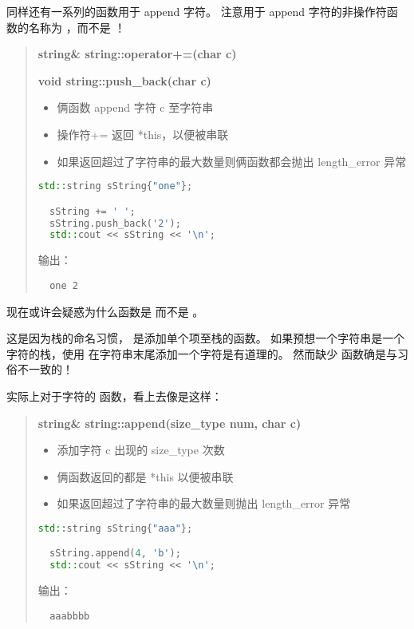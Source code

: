 \documentclass[../../LearnCpp.tex]{subfiles}
\begin{document}
同样还有一系列的函数用于 append 字符。
注意用于 append 字符的非操作符函数的名称为 ，而不是 ！

\begin{quotation}
  \textbf{string\& string::operator+=(char c)}

  \textbf{void string::push\_back(char c)}

  \begin{itemize}
    \item 俩函数 append 字符 c 至字符串
    \item 操作符+= 返回 *this，以便被串联
    \item 如果返回超过了字符串的最大数量则俩函数都会抛出 length\_error 异常
  \end{itemize}

  \begin{lstlisting}[language=C++]
  std::string sString{"one"};

  sString += ' ';
  sString.push_back('2');
  std::cout << sString << '\n';
  \end{lstlisting}

  输出：

  \begin{lstlisting}
  one 2
  \end{lstlisting}
\end{quotation}

现在或许会疑惑为什么函数是  而不是 。

这是因为栈的命名习惯， 是添加单个项至栈的函数。
如果预想一个字符串是一个字符的栈，使用  在字符串末尾添加一个字符是有道理的。
然而缺少  函数确是与习俗不一致的！

实际上对于字符的  函数，看上去像是这样：

\begin{quotation}
  \textbf{string\& string::append(size\_type num, char c)}

  \begin{itemize}
    \item 添加字符 c 出现的 size\_type 次数
    \item 俩函数返回的都是 *this 以便被串联
    \item 如果返回超过了字符串的最大数量则抛出 length\_error 异常
  \end{itemize}

  \begin{lstlisting}[language=C++]
  std::string sString{"aaa"};

  sString.append(4, 'b');
  std::cout << sString << '\n';
  \end{lstlisting}

  输出：

  \begin{lstlisting}
  aaabbbb
  \end{lstlisting}
\end{quotation}
\end{document}
